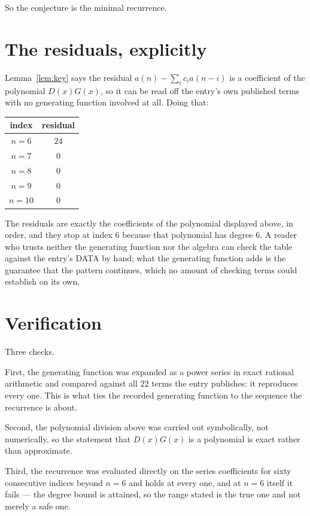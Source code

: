 \documentclass[11pt,a4paper]{article}
\theoremstyle{plain}
\theoremstyle{definition}
\begin{document}
So the conjecture is the minimal recurrence.

\section{The residuals, explicitly}

Lemma~\ref{lem:key} says the residual $a(n)-\sum_ic_ia(n-i)$ is a coefficient of the
polynomial $D(x)G(x)$, so it can be read off the entry's own published terms with no
generating function involved at all. Doing that:
\begin{center}
\begin{tabular}{cc}
index & residual \\ \hline
$n=6$ & $24$ \\
$n=7$ & $0$ \\
$n=8$ & $0$ \\
$n=9$ & $0$ \\
$n=10$ & $0$
\end{tabular}
\end{center}
The residuals are exactly the coefficients of the polynomial displayed above, in order, and
they stop at index $6$ because that polynomial has degree $6$. A reader who trusts
neither the generating function nor the algebra can check the table against the entry's DATA
by hand; what the generating function adds is the guarantee that the pattern continues, which
no amount of checking terms could establish on its own.

\section{Verification}

Three checks.

First, the generating function was expanded as a power series in exact rational arithmetic and
compared against all $22$ terms the entry publishes: it reproduces every one. This is
what ties the recorded generating function to the sequence the recurrence is about.

Second, the polynomial division above was carried out symbolically, not numerically, so the
statement that $D(x)G(x)$ is a polynomial is exact rather than approximate.

Third, the recurrence was evaluated directly on the series coefficients for sixty consecutive
indices beyond $n=6$ and holds at every one, and at $n=6$ itself it fails --- the
degree bound is attained, so the range stated is the true one and not merely a safe one.
\end{document}
